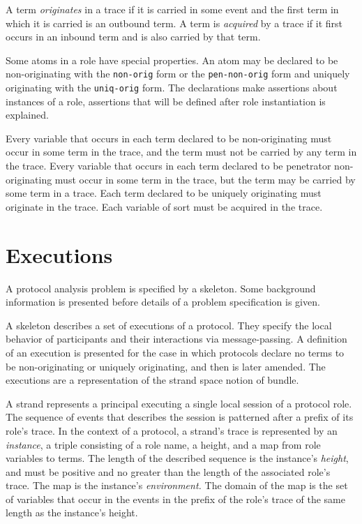 \documentclass[12pt]{article}
\begin{document}
A term \emph{originates} in a trace if it is
carried in some event and the first term in which it is
carried is an outbound term.  A term is
\emph{acquired} by a trace if it first occurs in an
inbound term and is also carried by that term.

Some atoms in a role have special properties.  An atom may be declared
to be non-originating with the \texttt{non-orig} form or the
\texttt{pen-non-orig} form and uniquely originating with the
\texttt{uniq-orig} form.  The declarations make assertions about
instances of a role, assertions that will be defined after role
instantiation is explained.

Every variable that occurs in each term declared to be non-originating
must occur in some term in the trace, and the term must not be carried
by any term in the trace.  Every variable that occurs in each term
declared to be penetrator non-originating must occur in some term in
the trace, but the term may be carried by some term in a trace.  Each
term declared to be uniquely originating must originate in the trace.
Each variable of sort  must be acquired in the trace.

\section{Executions}

A protocol analysis problem is specified by a skeleton.  Some
background information is presented before details of a problem
specification is given.

A skeleton describes a set of executions of a protocol.  They
specify the local behavior of participants and their interactions via
message-passing.  A definition of an execution is presented for the
case in which protocols declare no terms to be non-originating or
uniquely originating, and then is later amended.  The executions are a
representation of the strand space notion of bundle.

A strand represents a principal executing a single local
session of a protocol role.  The sequence of events that
describes the session is patterned after a prefix of its role's trace.
In the context of a protocol, a strand's trace is represented by an
\emph{instance}, a triple consisting of a role name, a
height, and a map from role variables to terms.  The length of the
described sequence is the instance's \emph{height}, and
must be positive and no greater than the length of the associated
role's trace.  The map is the instance's
\emph{environment.}  The domain of the map is the
set of variables that occur in the events in the prefix of the
role's trace of the same length as the instance's height.  \iffalse An
instance is in $I=R\times\nat\times(X\rightarrow T)$.  \fi
\end{document}

